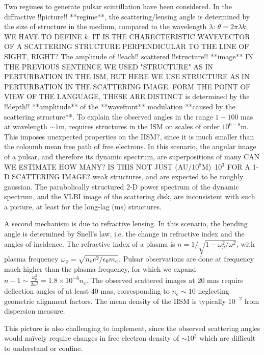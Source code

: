 \documentclass[useAMS,usenatbib]{mn2e}
\begin{document}
Two regimes to generate pulsar scintillation have been considered. In
the diffractive !!picture!! **regime**, the scattering/lensing angle is determined by
the size of structure in the medium, compared to the wavelength
$\lambda$: $\theta=2\pi\lambda k$. WE HAVE TO DEFINE $k$. IT IS THE CHARECTERISTIC WAVEVECTOR 
OF A SCATTERING STRUCTURE PERPENDICULAR TO THE LINE OF SIGHT, RIGHT?  The amplitude of !!each!! scattered
!!structure!! **image** IN THE PREVIOUS SENTENCE WE USED "STRUCTURE" AS IN PERTURBATION IN THE ISM,
BUT HERE WE USE STRUCTURE AS IN PERTURBATION IN THE SCATTERING IMAGE. FORM THE POINT OF VIEW
OF THE LANGUAGE, THESE ARE DISTINCT is determined by the !!depth!! **amplitude** of the **wavefront** modulation **caused by the scattering structure**.  To explain
the observed angles in the range $1-100$ mas at wavelength $\sim 1$m,
requires structures in the ISM on scales of order $10^{6-8}$m. This
imposes unexpected properties on the IISM?, since it is
much smaller than the coloumb mean free path of free electrons.  In 
this scenario, the angular image of a
pulsar, and therefore its dynamic spectrum, are superpositions of many CAN WE ESTIMATE HOW MANY?
IS THIS NOT JUST (AU/10$^8$M)~10$^3$ FOR A 1-D SCATTERING IMAGE?
weak structures, and are expected to be roughly gaussian.  The
parabolically structured 2-D power spectrum of the dynamic spectrum,
and the VLBI image of the scattering disk, are inconsistent with such
a picture, at least for the long-lag (ms) structures.

A second mechanism is due to refractive lensing.  In this scenario,
the bending angle is determined by Snell's law, i.e. the change in
refractive index and the angles of incidence.  The refractive index of
a plasma is $n=1/\sqrt{1-\omega_p^2/\omega^2}$, with plasma frequency
$\omega_{\rm p}=\sqrt{n_e e^2/\epsilon_{0}m_e}$.  Pulsar observations
are done at frequency much higher than the plasma frequency, for which
we expand $n-1 \sim \frac{\omega_p^2}{2 \omega^2} = 1.8\times 10^{-8}
n_e$.  The observed scattered images at 20 mas require deflection
angles of at least 40 mas, corresponding to $n_e \sim 10$ neglecting
geometric alignment factors.  The mean density of the IISM is
typically $10^{-2}$ from dispersion measure.


This
picture is also challenging to implement, since the observed
scattering angles would na\"ively require changes in free electron
density of $\sim 10^3$ 
which are difficult to understand or confine.
\end{document}
